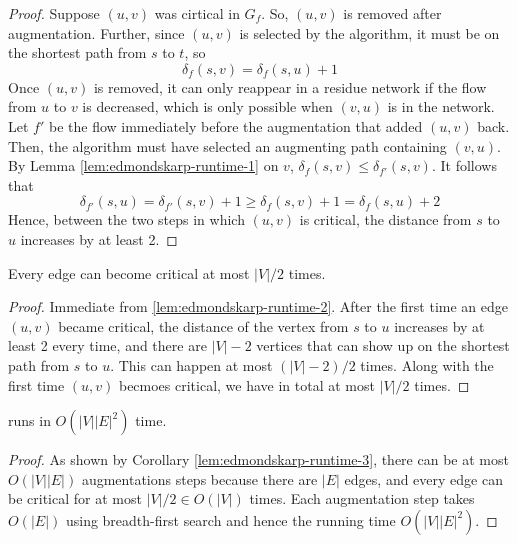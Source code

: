 \begin{proof}
    Suppose $(u,v)$ was cirtical in $G_f$. So, $(u,v)$ is removed after augmentation. Further, since $(u,v)$ is selected by the algorithm, it must be on the shortest path from $s$ to $t$, so
    $$
    \delta_f(s,v) = \delta_f(s,u) + 1
    $$
    Once $(u,v)$ is removed, it can only reappear in a residue network if the flow from $u$ to $v$ is decreased, which is only possible when $(v,u)$ is in the network. Let $f'$ be the flow immediately before the augmentation that added $(u,v)$ back. Then, the algorithm must have selected an augmenting path containing $(v,u)$. By Lemma \ref{lem:edmondskarp-runtime-1} on $v$, $\delta_{f}(s,v) \leq \delta_{f'}(s,v)$. It follows that
    $$
    \delta_{f'}(s,u) = \delta_{f'}(s,v) + 1 \geq \delta_{f}(s,v) + 1 = \delta_{f}(s,u) + 2
    $$
    Hence, between the two steps in which $(u,v)$ is critical, the distance from $s$ to $u$ increases by at least 2.
\end{proof}

\begin{corollary} \label{lem:edmondskarp-runtime-3}
    Every edge can become critical at most $|V|/2$ times.
\end{corollary}

\begin{proof}
    Immediate from \ref{lem:edmondskarp-runtime-2}. After the first time an edge $(u,v)$ became critical, the distance of the vertex from $s$ to $u$ increases by at least 2 every time, and there are $|V|-2$ vertices that can show up on the shortest path from $s$ to $u$. This can happen at most $(|V|-2)/2$ times. Along with the first time $(u,v)$ becmoes critical, we have in total at most $|V|/2$ times.
\end{proof}

\begin{theorem}
     runs in $O(|V||E|^2)$ time.
\end{theorem}

\begin{proof}
    As shown by Corollary \ref{lem:edmondskarp-runtime-3}, there can be at most $O(|V||E|)$ augmentations steps because there are $|E|$ edges, and every edge can be critical for at most $|V|/2 \in O(|V|)$ times. Each augmentation step takes $O(|E|)$ using breadth-first search and hence the running time $O(|V||E|^2)$.
\end{proof}